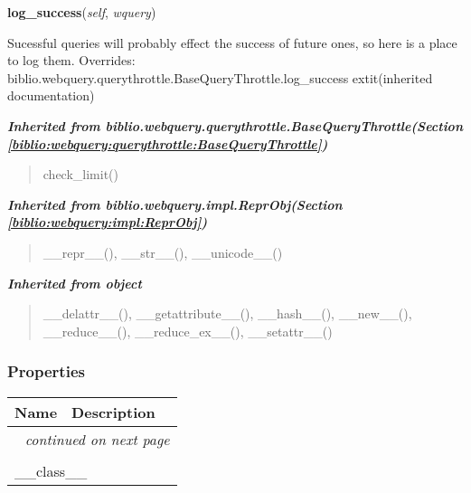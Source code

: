     \vspace{0.5ex}

\hspace{.8\funcindent}\begin{boxedminipage}{\funcwidth}

    \raggedright \textbf{log\_success}(\textit{self}, \textit{wquery})

\setlength{\parskip}{2ex}

Sucessful queries will probably effect the success of future ones, so
here is a place to log them.
\setlength{\parskip}{1ex}
      Overrides: biblio.webquery.querythrottle.BaseQueryThrottle.log\_success 	extit{(inherited documentation)}

    \end{boxedminipage}


\large{\textbf{\textit{Inherited from biblio.webquery.querythrottle.BaseQueryThrottle\textit{(Section \ref{biblio:webquery:querythrottle:BaseQueryThrottle})}}}}

\begin{quote}
check\_limit()
\end{quote}

\large{\textbf{\textit{Inherited from biblio.webquery.impl.ReprObj\textit{(Section \ref{biblio:webquery:impl:ReprObj})}}}}

\begin{quote}
\_\_repr\_\_(), \_\_str\_\_(), \_\_unicode\_\_()
\end{quote}

\large{\textbf{\textit{Inherited from object}}}

\begin{quote}
\_\_delattr\_\_(), \_\_getattribute\_\_(), \_\_hash\_\_(), \_\_new\_\_(), \_\_reduce\_\_(), \_\_reduce\_ex\_\_(), \_\_setattr\_\_()
\end{quote}


  \subsubsection{Properties}

    \vspace{-1cm}
\hspace{\varindent}\begin{longtable}{|p{\varnamewidth}|p{\vardescrwidth}|l}
\cline{1-2}
\cline{1-2} \centering \textbf{Name} & \centering \textbf{Description}& \\
\cline{1-2}
\endhead\cline{1-2}\multicolumn{3}{r}{\small\textit{continued on next page}}\\\endfoot\cline{1-2}
\endlastfoot\multicolumn{2}{|l|}{\textit{Inherited from object}}\\
\multicolumn{2}{|p{\varwidth}|}{\raggedright \_\_class\_\_}\\
\cline{1-2}
\end{longtable}


